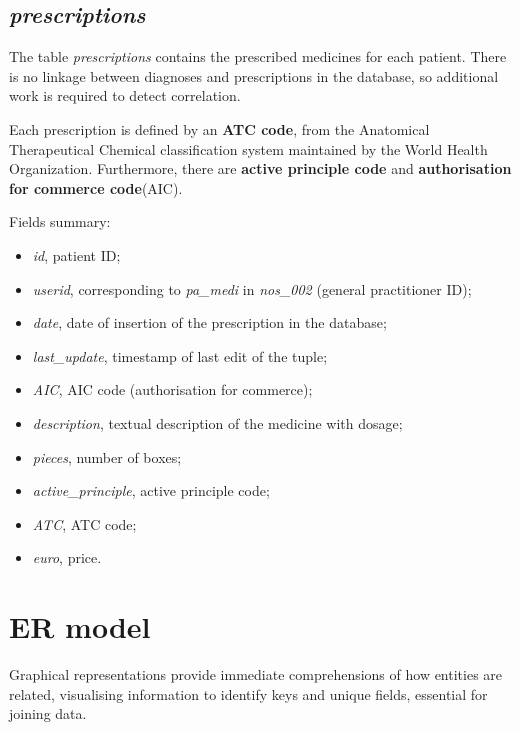 \subsection{\textit{prescriptions}}
The table \textit{prescriptions} contains the prescribed medicines for each patient. There is no linkage between diagnoses and prescriptions in the database, so additional work is required to detect correlation.

Each prescription is defined by an \textbf{ATC code}, from the Anatomical Therapeutical Chemical classification system maintained by the World Health Organization. Furthermore, there are \textbf{active principle code} and \textbf{authorisation for commerce code}(AIC).

Fields summary:
\begin{itemize}
	\item \textit{id}, patient ID;
	\item \textit{userid}, corresponding to \textit{pa\_medi }in \textit{nos\_002} (general practitioner ID);
	\item \textit{date}, date of insertion of the prescription in the database;
	\item \textit{last\_update}, timestamp of last edit of the tuple;
	\item \textit{AIC}, AIC code (authorisation for commerce);
	\item \textit{description}, textual description of the medicine with dosage;
	\item \textit{pieces}, number of boxes;
	\item \textit{active\_principle}, active principle code;
	\item \textit{ATC}, ATC code;
	\item \textit{euro}, price.
\end{itemize}

\section{ER model}
Graphical representations provide immediate comprehensions of how entities are related, visualising information to identify keys and unique fields, essential for joining data.

